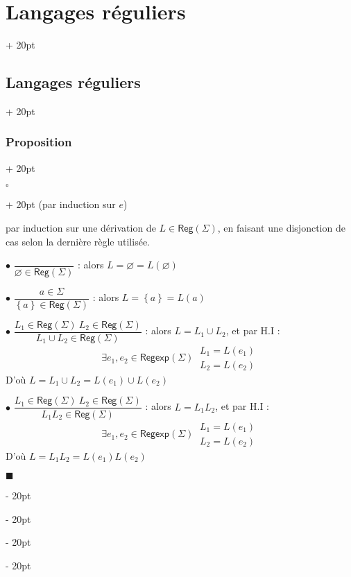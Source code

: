 \documentclass[a4paper, 12pt, twoside]{article}
\newcommand{\set}[1]{\left\{ #1 \right\}}
\newcommand{\ind}[1][20pt]{\advance\leftskip + #1}
\newcommand{\deind}[1][20pt]{\advance\leftskip - #1}
\newenvironment{indt}[2][20pt]{#2 \par \ind[#1]}{\par \deind} %
\newenvironment{proof}[1][{}]{\begin{indt}{$\square$ #1}}{$\blacksquare$ \end{indt}}
\newcommand{\Reg}{\mathsf{Reg}}
\newcommand{\Regexp}{\mathsf{Regexp}}
\begin{document}
\begin{indt}{\section{Langages réguliers}}
\begin{indt}{\subsection{Langages réguliers}}
\begin{indt}{\subsubsection{Proposition}}
                \vspace{12pt}
                
                \begin{proof}
                    \boxed{\Leftarrow} 
                    (par induction sur $e$)

                    \vspace{12pt}
                    
                    \boxed{\Rightarrow} par induction sur une dérivation de $L \in \Reg(\Sigma)$, en faisant une disjonction de cas selon la dernière règle utilisée.

                    \vspace{6pt}
                    
                    $\bullet$ $\dfrac{}{\varnothing \in \Reg(\Sigma)}$ : alors $L = \varnothing = L(\varnothing)$

                    \vspace{6pt}
                    
                    $\bullet$ $\dfrac{a \in \Sigma}{\set a \in \Reg(\Sigma)}$ : alors $L = \set a = L(a)$

                    \vspace{6pt}
                    
                    $\bullet$ $\dfrac{L_1 \in \Reg(\Sigma)\ L_2 \in \Reg(\Sigma)}{L_1 \cup L_2 \in \Reg(\Sigma)}$ : alors $L = L_1 \cup L_2$, et par H.I :
                    \[
                        \exists e_1, e_2 \in \Regexp(\Sigma)\
                        \begin{array}{|l}
                            L_1 = L(e_1)
                            \\
                            L_2 = L(e_2)
                        \end{array}
                    \]
                    D'où $L = L_1 \cup L_2 = L(e_1) \cup L(e_2)$

                    \vspace{6pt}
                    
                    $\bullet$ $\dfrac{L_1 \in \Reg(\Sigma)\ L_2 \in \Reg(\Sigma)}{L_1 L_2 \in \Reg(\Sigma)}$ : alors $L = L_1 L_2$, et par H.I :
                    \[
                        \exists e_1, e_2 \in \Regexp(\Sigma)\
                        \begin{array}{|l}
                            L_1 = L(e_1)
                            \\
                            L_2 = L(e_2)
                        \end{array}
                    \]
                    D'où $L = L_1 L_2 = L(e_1) L(e_2)$


\end{proof}
\end{indt}
\end{indt}
\end{indt}
\end{document}
